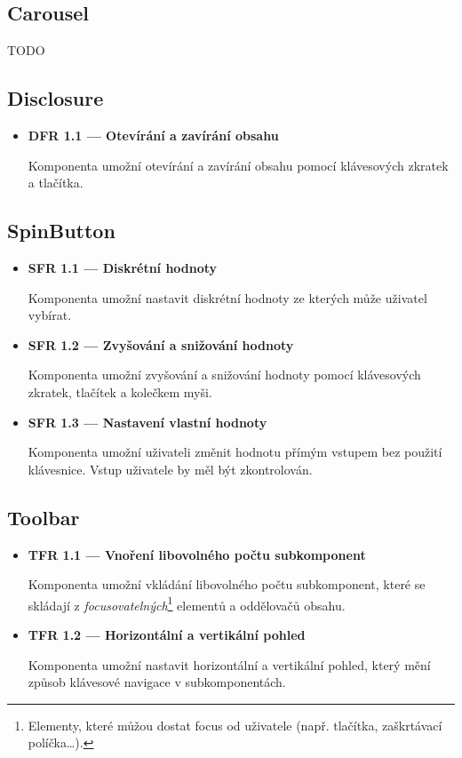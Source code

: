 \subsection{Carousel}

TODO

\subsection{Disclosure}

\begin{itemize}
      \item \textbf{DFR 1.1 --- Otevírání a zavírání obsahu}

            Komponenta umožní otevírání a zavírání obsahu pomocí klávesových zkratek a tlačítka.

\end{itemize}

\subsection{SpinButton}

\begin{itemize}
      \item \textbf{SFR 1.1 --- Diskrétní hodnoty}

            Komponenta umožní nastavit diskrétní hodnoty ze kterých může uživatel vybírat.

      \item \textbf{SFR 1.2 --- Zvyšování a snižování hodnoty}

            Komponenta umožní zvyšování a snižování hodnoty pomocí klávesových zkratek, tlačítek a kolečkem myši.

      \item \textbf{SFR 1.3 --- Nastavení vlastní hodnoty}

            Komponenta umožní uživateli změnit hodnotu přímým vstupem bez použití klávesnice.
            Vstup uživatele by měl být zkontrolován.

\end{itemize}

\subsection{Toolbar}

\begin{itemize}
      \item \textbf{TFR 1.1 --- Vnoření libovolného počtu subkomponent}\label{tfr11}

            Komponenta umožní vkládání libovolného počtu subkomponent, které se skládají z \textit{focusovatelných}\footnote{Elementy, které můžou dostat focus od uživatele (např. tlačítka, zaškrtávací políčka\dots).} elementů a oddělovačů obsahu.

      \item \textbf{TFR 1.2 --- Horizontální a vertikální pohled}\label{tfr12}

            Komponenta umožní nastavit horizontální a vertikální pohled, který mění způsob klávesové navigace v subkomponentách.
\end{itemize}

